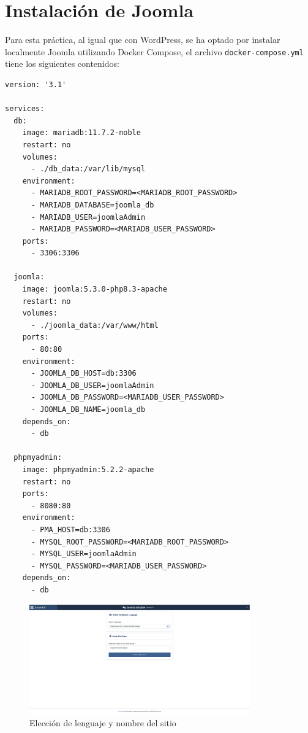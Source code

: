 \documentclass[a4paper]{article}
\begin{document}
\section{Instalación de Joomla}

Para esta práctica, al igual que con WordPress, se ha optado por instalar localmente Joomla utilizando Docker Compose, el archivo \texttt{docker-compose.yml} tiene los siguientes contenidos:


\begin{verbatim}
version: '3.1'

services:
  db:
    image: mariadb:11.7.2-noble
    restart: no
    volumes:
      - ./db_data:/var/lib/mysql
    environment:
      - MARIADB_ROOT_PASSWORD=<MARIADB_ROOT_PASSWORD>
      - MARIADB_DATABASE=joomla_db
      - MARIADB_USER=joomlaAdmin
      - MARIADB_PASSWORD=<MARIADB_USER_PASSWORD>
    ports:
      - 3306:3306

  joomla:
    image: joomla:5.3.0-php8.3-apache
    restart: no
    volumes:
      - ./joomla_data:/var/www/html
    ports:
      - 80:80
    environment:
      - JOOMLA_DB_HOST=db:3306
      - JOOMLA_DB_USER=joomlaAdmin
      - JOOMLA_DB_PASSWORD=<MARIADB_USER_PASSWORD>
      - JOOMLA_DB_NAME=joomla_db
    depends_on:
      - db

  phpmyadmin:
    image: phpmyadmin:5.2.2-apache
    restart: no
    ports:
      - 8080:80
    environment:
      - PMA_HOST=db:3306
      - MYSQL_ROOT_PASSWORD=<MARIADB_ROOT_PASSWORD>
      - MYSQL_USER=joomlaAdmin
      - MYSQL_PASSWORD=<MARIADB_USER_PASSWORD>
    depends_on:
      - db
\end{verbatim}

\begin{figure}[H]
    \centering
    \includegraphics[width=0.85\textwidth]{images/install-1.png}
    \caption{Elección de lenguaje y nombre del sitio}
\end{figure}
\end{document}
